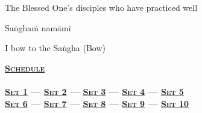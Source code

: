 \begin{english}
  The Blessed One's disciples who have practiced well
\end{english}

Saṅghaṁ namāmi

\begin{english}
  I bow to the Saṅgha \hfill{\textnormal{\ifafiveversion\fontsize{12.5}{18}\fi\ifasixversion\fontsize{9}{13}\fi\selectfont (Bow)}}\\
\end{english}

\suttaRef{[Thai]}

\null
\vfill

\ifdigitalversion
  \begin{minipage}[b][25pt][c]{\linewidth}
    \begin{leader}
      \textbf{\vspace{0.2em}\textsc{\hyperref[schedule]{Schedule}\\
          {\centering{}}\\
          \vspace{0.8em}
          \hyperref[buddhas-first-exclamation]{Set 1} \hspace{0.02cm} — \hspace{0.02cm} \hyperref[characteristic-of-not-self]{Set 2} \hspace{0.02cm} — \hspace{0.02cm} \hyperref[noble-eightfold-path]{Set 3} \hspace{0.02cm} — \hspace{0.02cm} \hyperref[dedication-of-offerings]{Set 4} \hspace{0.02cm} — \hspace{0.02cm} \hyperref[mindfulness-of-breathing]{Set 5}\\
          \vspace{0.5em}
          \hyperref[anatta-lakkhana]{Set 6} — \hyperref[dependent-origination]{Set 7} — \hyperref[aditta-pariyaya]{Set 8} — \hyperref[deva-aradhana]{Set 9} — \hyperref[pubba-bhaga-nama-kara-patho-funeral]{Set 10}}}
    \end{leader}
  \end{minipage}
\fi
